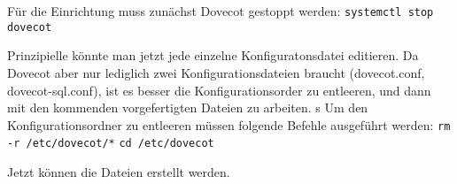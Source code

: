 Für die Einrichtung muss zunächst Dovecot gestoppt werden:\newline
\verb|systemctl stop dovecot|\newline

Prinzipielle könnte man jetzt jede einzelne Konfiguratonsdatei editieren. Da Dovecot aber nur lediglich zwei Konfigurationsdateien braucht (dovecot.conf, dovecot-sql.conf), ist es besser die Konfigurationsorder zu entleeren, und dann mit den kommenden vorgefertigten Dateien zu arbeiten.
s
Um den Konfigurationsordner zu entleeren müssen folgende Befehle ausgeführt werden:\newline
\verb|rm -r /etc/dovecot/*|\newline
\verb|cd /etc/dovecot|\newline

Jetzt können die Dateien erstellt werden.

